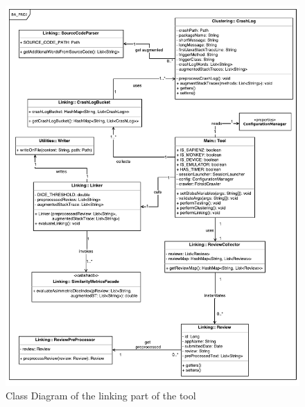 \begin{figure}[t]
\centering 
\includegraphics[width=\columnwidth]{diagrams/linking.pdf} 
\caption{Class Diagram of the linking part of the tool }
\label{linking}
\vspace{-3mm} 
\end{figure}